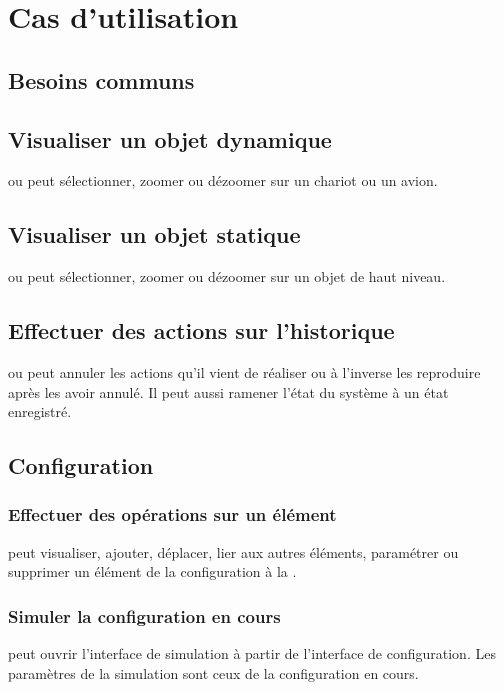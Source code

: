 \section{Cas d'utilisation}

\subsection{Besoins communs}
\subsection{Visualiser un objet dynamique}
 ou  peut sélectionner, zoomer ou dézoomer sur un chariot ou un avion.

\subsection{Visualiser un objet statique}
 ou  peut sélectionner, zoomer ou dézoomer sur un objet de haut niveau.

\subsection{Effectuer des actions sur l'historique}
 ou  peut annuler les actions qu'il vient de réaliser ou à l'inverse les reproduire après les avoir annulé. Il peut aussi ramener l'état du système à un état enregistré.

\subsection{Configuration}
\subsubsection{Effectuer des opérations sur un élément}
 peut visualiser, ajouter, déplacer, lier aux autres éléments, paramétrer ou supprimer un élément de la configuration à la .

\subsubsection{Simuler la configuration en cours}
 peut ouvrir l'interface de simulation à partir de l'interface de configuration. Les paramètres de la simulation sont ceux de la configuration en cours.

